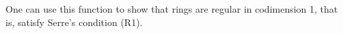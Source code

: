 \documentclass[11pt]{amsart}
\theoremstyle{definition}
\begin{document}


\begin{comment}~~
  
  ~~
  
  {{\small\color{blue}
\begin{verbatim}
i2 : R = ZZ/5[x, y, z];
i3 : I = ideal(random(3, R) - 2, random(2, R))
                3    2       2     3     2              2       2     3
o3 = ideal (- 2x  + x y - x*y  - 2y  - 2x z + 2x*y*z + y z + y*z  - 2z 
-------------------------------------------------------------------
         2            2                 2
- 2, - 2x  - 2x*y + 2y  + x*z - 2y*z - z )
o3 : Ideal of R
i4 : M = jacobian(I)
o4 = {1} | -x2+2xy-y2+xz+2yz    x-2y+z   |
     {1} | x2-2xy-y2+2xz+2yz+z2 -2x-y-2z |
     {1} | -2x2+2xy+y2+2yz-z2   x-2y-2z  |
             3       2
o4 : Matrix R  <--- R
i5 : extendIdealByNonZeroMinor(2, M, I, Strategy => LinearIntersection)
                3    2       2     3     2              2       2     3
o5 = ideal (- 2x  + x y - x*y  - 2y  - 2x z + 2x*y*z + y z + y*z  - 2z 
-------------------------------------------------------------------
         2            2                 2   3    2        2    3  
- 2, - 2x  - 2x*y + 2y  + x*z - 2y*z - z , x  + x y + 2x*y  - y  +
-------------------------------------------------------------------
  2       2    3
2x z + y*z  - z )
o5 : Ideal of R
\end{verbatim}}	
    }}	
\end{comment}

One can use this function to show that rings are regular in codimension 1, that is, satisfy Serre's condition (R1).
\end{document}
